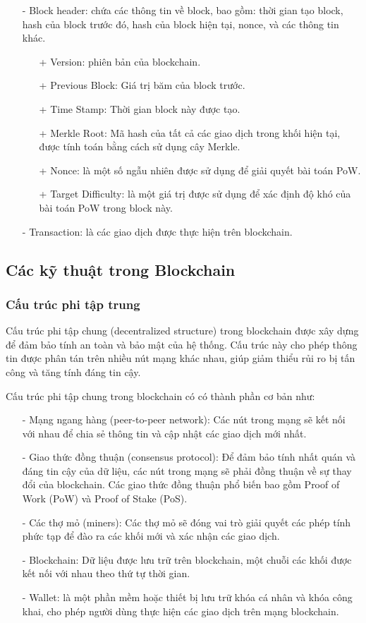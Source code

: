 \begin{itemize}
    \item[-] Block header: chứa các thông tin về block, bao gồm: thời gian tạo block, hash của block trước đó, hash của block hiện tại, nonce, và các thông tin khác.
    \begin{itemize}
        \item[+] Version: phiên bản của blockchain.
        \item[+] Previous Block: Giá trị băm của block trước.
        \item[+] Time Stamp: Thời gian block này được tạo.
        \item[+] Merkle Root: Mã hash của tất cả các giao dịch trong khối hiện tại, 
        được tính toán bằng cách sử dụng cây Merkle.
        \item[+] Nonce: là một số ngẫu nhiên được sử dụng để giải quyết bài toán PoW.
        \item[+] Target Difficulty: là một giá trị được sử dụng để xác định độ khó của bài toán PoW trong block này.
    \end{itemize}
    \item[-] Transaction: là các giao dịch được thực hiện trên blockchain.
\end{itemize}

\subsection{Các kỹ thuật trong Blockchain}
\subsubsection{Cấu trúc phi tập trung}
Cấu trúc phi tập chung (decentralized structure) trong blockchain được xây dựng 
để đảm bảo tính an toàn và bảo mật của hệ thống. Cấu trúc này cho phép thông tin được phân tán trên nhiều nút mạng khác nhau, giúp giảm thiểu rủi ro bị tấn công và tăng tính đáng tin cậy.

Cấu trúc phi tập chung trong blockchain có có thành phần cơ bản như:
\begin{itemize}
    \item[-] Mạng ngang hàng (peer-to-peer network): Các nút trong mạng sẽ kết 
    nối với nhau để chia sẻ thông tin và cập nhật các giao dịch mới nhất.
    \item[-] Giao thức đồng thuận (consensus protocol): Để đảm bảo tính nhất 
    quán và đáng tin cậy của dữ liệu, các nút trong mạng sẽ phải đồng thuận về 
    sự thay đổi của blockchain. Các giao thức đồng thuận phổ biến bao gồm Proof 
    of Work (PoW) và Proof of Stake (PoS).
    \item[-] Các thợ mỏ (miners): Các thợ mỏ sẽ đóng vai trò giải quyết các
    phép tính phức tạp để đào ra các khối mới và xác nhận các giao dịch.
    \item[-] Blockchain: Dữ liệu được lưu trữ trên blockchain, một chuỗi
    các khối được kết nối với nhau theo thứ tự thời gian.
    \item[-] Wallet: là một phần mềm hoặc thiết bị lưu trữ khóa cá nhân và
    khóa công khai, cho phép người dùng thực hiện các giao dịch trên mạng
    blockchain.
\end{itemize}

